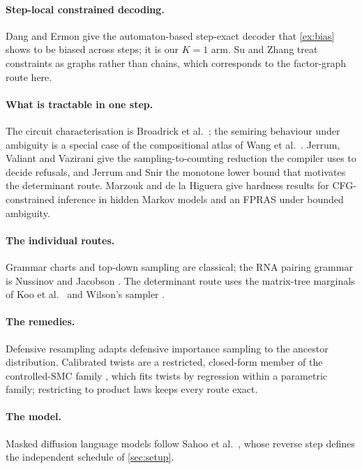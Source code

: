 \documentclass[11pt]{article}
\theoremstyle{definition}
\begin{document}
\paragraph{Step-local constrained decoding.}
Dang and Ermon \cite{de26} give the automaton-based step-exact decoder that \cref{ex:bias} shows to be biased
across steps; it is our $K=1$ arm. Su and Zhang \cite{sz26} treat constraints as graphs rather than chains, which
corresponds to the factor-graph route here.

\paragraph{What is tractable in one step.}
The circuit characterisation is Broadrick et al.\ \cite{broadrick2025}; the semiring behaviour under ambiguity is
a special case of the compositional atlas of Wang et al.\ \cite{wang2024atlas}. Jerrum, Valiant and Vazirani
\cite{jvv86} give the sampling-to-counting reduction the compiler uses to decide refusals, and Jerrum and Snir
\cite{jerrumsnir1982} the monotone lower bound that motivates the determinant route. Marzouk and de la Higuera
\cite{marzouk2022} give hardness results for CFG-constrained inference in hidden Markov models and an FPRAS under
bounded ambiguity.

\paragraph{The individual routes.}
Grammar charts and top-down sampling are classical; the RNA pairing grammar is Nussinov and Jacobson
\cite{nussinov1980}. The determinant route uses the matrix-tree marginals of Koo et al.\ \cite{koo2007} and
Wilson's sampler \cite{wilson1996}.

\paragraph{The remedies.}
Defensive resampling adapts defensive importance sampling \cite{hesterberg1995} to the ancestor distribution.
Calibrated twists are a restricted, closed-form member of the controlled-SMC family \cite{heng2020}, which fits
twists by regression within a parametric family; restricting to product laws keeps every route exact.

\paragraph{The model.}
Masked diffusion language models follow Sahoo et al.\ \cite{sahoo2024}, whose reverse step defines the
independent schedule of \cref{sec:setup}.
\end{document}
